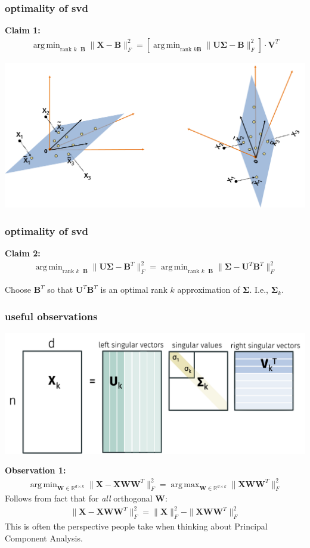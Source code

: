 \documentclass[compress]{beamer}
\newcommand{\bs}[1]{\boldsymbol{#1}}
\newcommand{\bv}[1]{\mathbf{#1}}
\newcommand{\R}{\mathbb{R}}
\DeclareMathOperator*{\argmin}{arg\,min}
\DeclareMathOperator*{\argmax}{arg\,max}
\begin{document}
\begin{frame}[t]
	\frametitle{optimality of svd}
	\textbf{Claim 1:}
	\begin{align*}
		\argmin_{\text{rank $k$ }\bv{B}}  \|\bv{X} - \bv{B}\|_F^2 = \left[\argmin_{\text{rank $k$}\bv{B}}   \|\bv{U}\bs{\Sigma} -\bv{B}\|_F^2\right] \cdot\bv{V}^T
	\end{align*}

		\begin{center}
	\includegraphics[width=.8\textwidth]{rotation_invariant.png}
\end{center} 
\end{frame}

\begin{frame}[t]
	\frametitle{optimality of svd}		
	\textbf{Claim 2:}
	\begin{align*}
		\argmin_{\text{rank $k$ }\bv{B}}  \|\bv{U}\bs{\Sigma} -  \bv{B}^T\|_F^2 = \argmin_{\text{rank $k$ }\bv{B}}  \|\bs{\Sigma} -  \bv{U}^T\bv{B}^T\|_F^2 
	\end{align*}

Choose $\bv{B}^T$ so that $\bv{U}^T\bv{B}^T$ is an optimal rank $k$ approximation of $\bs{\Sigma}$. I.e., $\bs{\Sigma}_k$.
\end{frame}

\begin{frame}[t]
	\frametitle{useful observations}
		\begin{center}
		\includegraphics[width=.7\textwidth]{svdk.png}
	\end{center} 
\textbf{Observation 1:}
\begin{align*}
	\argmin_{\bv{W} \in \R^{d\times k}} \|\bv{X} - \bv{X}\bv{W}\bv{W}^T\|_F^2 = \argmax_{\bv{W} \in \R^{d\times k}} \|\bv{X}\bv{W}\bv{W}^T\|_F^2
\end{align*}
{Follows from fact that for \emph{all} orthogonal $\bv{W}$:}
\begin{align*}
	 \|\bv{X} - \bv{X}\bv{W}\bv{W}^T\|_F^2 =  \|\bv{X}\|_F^2 - \|\bv{X}\bv{W}\bv{W}^T\|_F^2
\end{align*} 
This is often the perspective people take when thinking about Principal Component Analysis. 
\end{frame}
\end{document}
